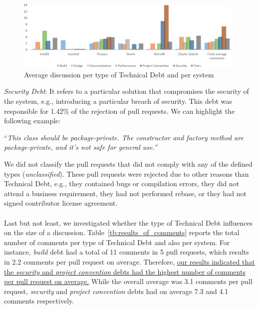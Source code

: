 \documentclass{sig-alternate}
\newcommand{\aspas}[1]{{``#1''}}
\newcommand{\frase}[2]{%
\noindent
\begin{center}
\begin{adjustwidth}{0.8cm}{0.8cm}
\aspas{\em #1}\\[0.1cm]
\hspace*{\fill}{({\em#2})}
\vspace{5pt}
\end{adjustwidth}
\end{center}
}
\begin{document}
\begin{figure}
	\begin{center}
		\vspace{5pt}
		\includegraphics[width=0.98\textwidth]{average_comments.png}
		\caption{Average discussion per type of Technical Debt and per system}
		\label{fig:average_comments}
	\end{center}
	\vspace{-5pt}
\end{figure}



{\noindent \em Security Debt}: It refers to a particular solution that compromises the security of the system, e.g., introducing a particular breach of security. 
{This debt was responsible for 1.42\% of the rejection of pull requests}. We can highlight the following example:

\frase{This class should be package-private. The constructor and factory method are package-private, and it's not safe for general use.}{Retrofit}

We did not classify the pull requests that did not comply with any of the defined types ({\em unclassified}).
These pull requests were rejected due to other reasons than Technical Debt, e.g., they contained bugs or compilation errors, they did not attend a business requirement, they had not performed rebase, or they had not signed contributor license agreement.\\

\rqiv\\[-0.2cm]

Last but not least, we investigated whether the type of Technical Debt influences on the size of a discussion.
%
Table~\ref{tb:results_of_comments} reports the total number of comments per type of Technical Debt
and also per system. For instance, {\em build} debt had a total of 11 comments in 5 pull requests,
which results in 2.2 comments per pull request on average. 
Therefore, \ul{our results indicated that the \textit{security} and \textit{project convention} debts had the highest number of comments per pull request on average.} 
While the overall average was 3.1 comments per pull request,
{\em security} and {\em project convention} debts had on average 7.3 and 4.1 comments respectively. 
\end{document}
